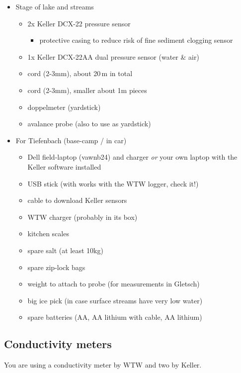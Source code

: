 \documentclass[DIV=15,halfparskip,11pt,headinclude]{scrartcl}
\begin{document}
\begin{itemize}
\begin{itemize}
    detection points of two supraglacial streams.
  \end{itemize}
\item Stage of lake and streams
  \begin{itemize}
  \item 2x Keller DCX-22 pressure sensor
  \begin{itemize}
    \item protective casing to
      reduce risk of fine sediment clogging sensor
    \end{itemize}
  \item 1x Keller DCX-22AA dual pressure sensor (water \& air)
  \item cord (2-3mm), about 20\,m in total
  \item cord (2-3mm), smaller about 1m pieces
  \item doppelmeter (yardstick)
  \item avalance probe (also to use as yardstick)
  \end{itemize}
\item For Tiefenbach (base-camp / in car)
  \begin{itemize}
  \item Dell field-laptop (vawnb24) and charger \emph{or} your own laptop with the Keller software installed
  \item USB stick (with works with the WTW logger, check it!)
  \item cable to download Keller sensors
  \item WTW charger (probably in its box)
  \item kitchen scales
  \item spare salt (at least 10kg)
  \item spare zip-lock bags
  \item weight to attach to probe (for measurements in Gletsch)
  \item big ice pick (in case surface streams have very low water)
  \item spare batteries (AA, AA lithium with cable, AA lithium)
  \end{itemize}
\end{itemize}


\subsection{Conductivity meters}
\label{s:cond-meters}

You are using a conductivity meter by WTW and two by Keller.
\end{document}
